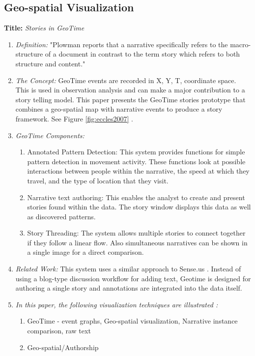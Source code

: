 \documentclass{egpubl}
\begin{document}
\subsection{Geo-spatial Visualization}

\textbf{Title:} \textit{Stories in GeoTime}
\begin{enumerate}
\item \textit{Definition:} "Plowman \cite{plowman1999} reports that a narrative specifically refers to the macro-structure of a document in contrast to the term story which refers to both structure and content."
\item \textit{The Concept:} GeoTime events are recorded in X, Y, T, coordinate space. This is used in observation analysis and can make a major contribution to a story telling model. This paper presents the GeoTime stories prototype that combines a geo-spatial map with narrative events to produce a story framework. See Figure \ref{fig:eccles2007} \cite{eccles2007}.
\item \textit{GeoTime Components:}
\begin{enumerate}
\item Annotated Pattern Detection: This system provides functions for simple pattern detection in movement activity. These functions look at possible interactions between people within the narrative, the speed at which they travel, and the type of location that they visit.
\item Narrative text authoring: This enables the analyst to create and present stories found within the data. The story window displays this data as well as discovered patterns. 
\item Story Threading: The system allows multiple stories to connect together if they follow a linear flow. Also simultaneous narratives can be shown in a single image for a direct comparison.
\end{enumerate}
\item \textit{Related Work:}  This system uses a similar approach to Sense.us \cite{heer2007}. Instead of using a blog-type discussion workflow for adding text, Geotime is designed for authoring a single story and annotations are integrated into the data itself.
\item \textit{In this paper, the following visualization techniques are illustrated :} 
\begin{enumerate}
\item GeoTime - event graphs, Geo-spatial visualization, Narrative instance comparison, raw text
\item Geo-spatial/Authorship
\end{enumerate}
\end{enumerate}
\end{document}

